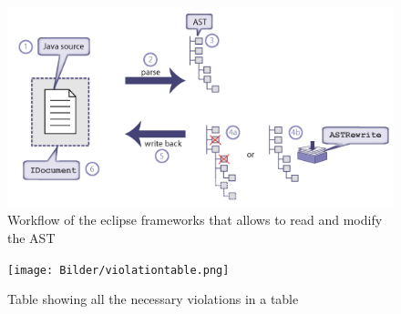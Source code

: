 \begin{figure}
\centering
\includegraphics[width=12cm]{Bilder/workflowAST.png}
\caption[Workflow of the eclipse frameworks that allows to read and modify the \ac{AST}]{Workflow of the eclipse frameworks that allows to read and modify the \ac{AST}}
\label{picture:workflowast}
\end{figure}

\begin{figure}
\centering
\texttt{[image: Bilder/violationtable.png]}
\caption[Table showing all the necessary violations in a table]{Table showing all the necessary violations in a table}
\label{picture:violationtable}
\end{figure}
